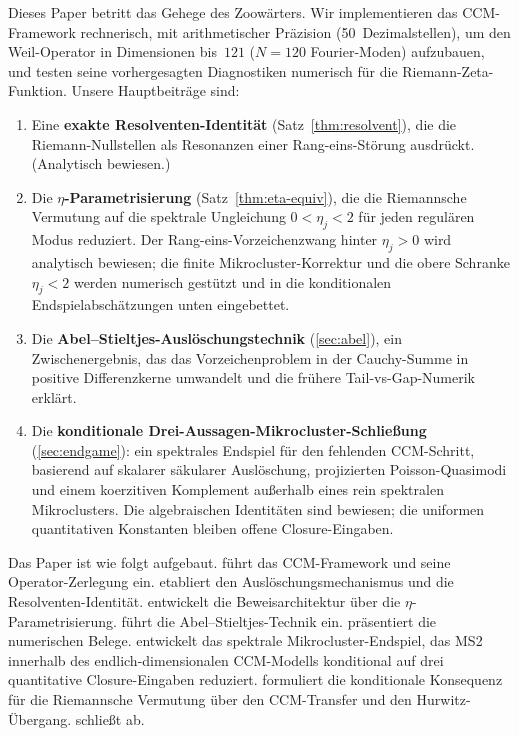 \documentclass[12pt,a4paper]{article}
\theoremstyle{definition}
\theoremstyle{remark}
\begin{document}
Dieses Paper betritt das Gehege des Zoowärters.
Wir implementieren das CCM-Framework rechnerisch, mit arithmetischer Präzision
(50~Dezimalstellen), um den Weil-Operator in Dimensionen bis~$121$
($N = 120$ Fourier-Moden) aufzubauen, und testen seine vorhergesagten
Diagnostiken numerisch für die Riemann-Zeta-Funktion.
Unsere Hauptbeiträge sind:

\begin{enumerate}[label=(\roman*)]
\item Eine \textbf{exakte Resolventen-Identität} (Satz~\ref{thm:resolvent}),
  die die Riemann-Nullstellen als Resonanzen einer Rang-eins-Störung ausdrückt.
  (Analytisch bewiesen.)
\item Die \textbf{$\eta$-Parametrisierung} (Satz~\ref{thm:eta-equiv}),
  die die Riemannsche Vermutung auf die spektrale Ungleichung
  $0 < \eta_j < 2$ für jeden regulären Modus reduziert. Der
  Rang-eins-Vorzeichenzwang hinter $\eta_j>0$ wird analytisch bewiesen;
  die finite Mikrocluster-Korrektur und die obere Schranke $\eta_j<2$
  werden numerisch gestützt und in die konditionalen Endspielabschätzungen
  unten eingebettet.
\item Die \textbf{Abel--Stieltjes-Auslöschungstechnik}
  (\cref{sec:abel}), ein Zwischenergebnis, das das Vorzeichenproblem
  in der Cauchy-Summe in positive Differenzkerne umwandelt und
  die frühere Tail-vs-Gap-Numerik erklärt.
\item Die \textbf{konditionale Drei-Aussagen-Mikrocluster-Schließung}
  (\cref{sec:endgame}): ein spektrales Endspiel für den fehlenden
  CCM-Schritt, basierend auf skalarer säkularer Auslöschung, projizierten
Poisson-Quasimodi und einem koerzitiven Komplement außerhalb eines
  rein spektralen Mikroclusters. Die algebraischen Identitäten sind
  bewiesen; die uniformen quantitativen Konstanten bleiben offene
  Closure-Eingaben.
\end{enumerate}

Das Paper ist wie folgt aufgebaut.
 führt das CCM-Framework und seine Operator-Zerlegung ein.
 etabliert den Auslöschungsmechanismus und die
Resolventen-Identität.
 entwickelt die Beweisarchitektur über die
$\eta$-Parametrisierung.
 führt die Abel--Stieltjes-Technik ein.
 präsentiert die numerischen Belege.
 entwickelt das spektrale Mikrocluster-Endspiel, das
MS2 innerhalb des endlich-dimensionalen CCM-Modells konditional auf drei
quantitative Closure-Eingaben reduziert.
 formuliert die konditionale Konsequenz für die Riemannsche
Vermutung über den CCM-Transfer und den Hurwitz-Übergang.
 schließt ab.
\end{document}
